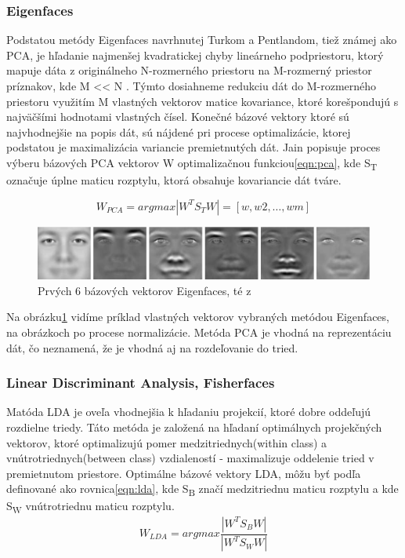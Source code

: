 \subsubsection{Eigenfaces}
Podstatou metódy Eigenfaces navrhnutej Turkom a Pentlandom\cite{turk1991eigenfaces}, tiež známej ako PCA,
je hľadanie najmenšej kvadratickej chyby lineárneho podpriestoru,
ktorý mapuje dáta z originálneho N-rozmerného priestoru na M-rozmerný priestor príznakov, kde M << N .
Týmto dosiahneme redukciu dát do M-rozmerného priestoru využitím M vlastných vektorov matice kovariance, ktoré korešpondujú s najväčšími hodnotami vlastných čísel\cite{handbookbio}.
Konečné bázové vektory ktoré sú najvhodnejšie na popis dát, sú nájdené pri procese optimalizácie, ktorej podstatou je  maximalizácia variancie premietnutých dát.
Jain popisuje\cite{handbookbio} proces výberu bázových PCA vektorov W optimalizačnou funkciou\eqref{eqn:pca}, kde S\textsubscript{T} označuje úplne maticu rozptylu,
ktorá obsahuje kovariancie dát tváre.


\begin{equation}\label{eqn:pca}
	W_{PCA} = arg max|W^T S_T W| = [w, w2,\dots,wm]
\end{equation}

\begin{figure}[H]
	\centering
	\includegraphics[width=1\linewidth]{img/eigenfaces}
	\caption{Prvých 6 bázových vektorov Eigenfaces, té z\cite[s.~45]{handbookbio}}
	\label{fig:eigenfaces}
\end{figure}

Na obrázku\ref{fig:eigenfaces} vidíme príklad vlastných vektorov vybraných metódou Eigenfaces, na obrázkoch po procese normalizácie.
Metóda PCA je vhodná na reprezentáciu dát, čo neznamená, že je vhodná aj na rozdeľovanie do tried.

\subsubsection{Linear Discriminant Analysis, Fisherfaces}
Matóda LDA\cite{duda2012pattern} je oveľa vhodnejšia k hľadaniu projekcií, ktoré dobre oddeľujú rozdielne triedy.
Táto metóda je založená na hľadaní optimálnych projekčných vektorov, ktoré optimalizujú pomer medzitriednych(within class) a vnútrotriednych(between class) vzdialeností - maximalizuje oddelenie tried
v premietnutom priestore.
Optimálne bázové vektory LDA, môžu byť podľa\cite{handbookbio} definované ako rovnica\eqref{eqn:lda}, kde S\textsubscript{B} značí medzitriednu maticu rozptylu a kde S\textsubscript{W}
vnútrotriednu maticu rozptylu.\\
\indent
\begin{equation}\label{eqn:lda}
	W_{LDA} = arg max \frac{|W^T S_B W|}{|W^T S_W W|}
\end{equation}

